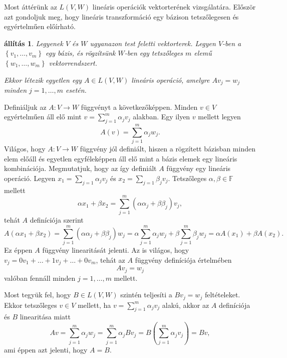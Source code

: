 \documentclass[9pt, a4paper, showtrims]{memoir}
\makeatletter
\renewenvironment{proof}[1][\proofname]
    {\par\pushQED{\qed}%
    \normalfont \topsep6\p@\@plus6\p@\relax
    \trivlist
    \item[\hskip\labelsep
        \itshape
    #1\@addpunct{:}]\ignorespaces}
    {\popQED\endtrivlist\@endpefalse}
\theoremstyle{plain}
\newtheorem{proposition}{állítás}[chapter]
\theoremstyle{remark}
\theoremstyle{definition}
\makeatother
\begin{document}
Most áttérünk az $L\left( V,W \right)$ lineáris operációk vektorterének vizsgálatára.
Először azt gondoljuk meg, hogy lineáris transzformáció egy bázison tetszőlegesen és egyértelműen előírható.
\begin{proposition}\label{pr:bazisonegyertelmu}
    Legyenek $V$ és $W$ ugyanazon test feletti vektorterek.
    Legyen $V$-ben a $\left\{ v_1,\dots,v_m \right\}$ egy bázis, 
    és rögzítsünk $W$-ben egy tetszőleges $m$ elemű $\left\{ w_1,\dots,w_m \right\}$ vektorrendszert.

    Ekkor létezik egyetlen egy $A\in L\left( V,W \right)$ lineáris operáció,
    amelyre $Av_j=w_j$ minden $j=1,\dots,m$ esetén.
\end{proposition}
\begin{proof}
    Definiáljuk az $A:V\to W$ függvényt a következőképpen.
    Minden $v\in V$ egyértelműen áll elő mint $v=\sum_{j=1}^m\alpha_jv_j$ alakban.
    Egy ilyen $v$ mellett legyen
    \[
        A\left( v \right)=\sum_{j=1}^m\alpha_jw_j.
    \]
    Világos, hogy $A:V\to W$ függvény jól definiált, hiszen a rögzített bázisban minden elem előáll és egyetlen egyféleképpen
    áll elő mint a bázis elemek egy lineáris kombinációja.
    Megmutatjuk, hogy az így definiált $A$ függvény egy lineáris operáció.
    Legyen $x_1=\sum_{j=1}\alpha_jv_j$ és
    $x_2=\sum_{j=1}\beta_jv_j$.
    Tetszőleges $\alpha,\beta\in\mathbb{F}$ mellett
    \[
        \alpha x_1+\beta x_2=
        \sum_{j=1}^m\left( \alpha\alpha_j+\beta\beta_j \right)v_j,
    \]
    tehát $A$ definíciója szerint
    \[
        A\left( \alpha x_1+\beta x_2 \right)=
        \sum_{j=1}^m\left( \alpha\alpha_j+\beta\beta_j \right)w_j
        =
        \alpha\sum_{j=1}^m\alpha_jw_j+
        \beta\sum_{j=1}^m\beta_jw_j=
        \alpha A\left( x_1 \right)+\beta A\left( x_2 \right).
    \]
    Ez éppen $A$ függvény linearitását jelenti.
    Az is világos, hogy $v_j=0v_1+\ldots+1v_j+\ldots +0v_m$, tehát az $A$ függvény definíciója értelmében
    \[
        Av_j=w_j
    \] valóban fennáll minden $j=1,\dots,m$ mellett.

    Most tegyük fel, hogy $B\in L\left( V,W \right)$ szintén teljesíti a $Bv_j=w_j$ feltételeket.
    Ekkor tetszőleges $v\in V$ mellett, ha $v=\sum_{j=1}^m\alpha_jv_j$ alakú,
    akkor az $A$ definíciója és $B$ linearitása miatt
    \[
        Av=\sum_{j=1}^m\alpha_jw_j=
        \sum_{j=1}^m\alpha_jBv_j=
        B\left( \sum_{j=1}^m\alpha_jv_j \right)=Bv,
    \]
    ami éppen azt jelenti, hogy $A=B$.
\end{proof}
\end{document}
